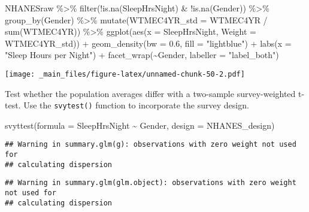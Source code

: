\documentclass[
]{book}
\newenvironment{Shaded}{\begin{snugshade}}{\end{snugshade}}
\newcommand{\AttributeTok}[1]{\textcolor[rgb]{0.77,0.63,0.00}{#1}}
\newcommand{\FloatTok}[1]{\textcolor[rgb]{0.00,0.00,0.81}{#1}}
\newcommand{\FunctionTok}[1]{\textcolor[rgb]{0.00,0.00,0.00}{#1}}
\newcommand{\NormalTok}[1]{#1}
\newcommand{\SpecialCharTok}[1]{\textcolor[rgb]{0.00,0.00,0.00}{#1}}
\newcommand{\StringTok}[1]{\textcolor[rgb]{0.31,0.60,0.02}{#1}}
\theoremstyle{definition}
\theoremstyle{definition}
\theoremstyle{definition}
\theoremstyle{definition}
\theoremstyle{remark}
\begin{document}
\begin{Shaded}
\begin{Highlighting}[]
\NormalTok{NHANESraw }\SpecialCharTok{\%\textgreater{}\%} 
  \FunctionTok{filter}\NormalTok{(}\SpecialCharTok{!}\FunctionTok{is.na}\NormalTok{(SleepHrsNight) }\SpecialCharTok{\&} \SpecialCharTok{!}\FunctionTok{is.na}\NormalTok{(Gender)) }\SpecialCharTok{\%\textgreater{}\%}
  \FunctionTok{group\_by}\NormalTok{(Gender) }\SpecialCharTok{\%\textgreater{}\%}
  \FunctionTok{mutate}\NormalTok{(}\AttributeTok{WTMEC4YR\_std =}\NormalTok{ WTMEC4YR }\SpecialCharTok{/} \FunctionTok{sum}\NormalTok{(WTMEC4YR)) }\SpecialCharTok{\%\textgreater{}\%}
  \FunctionTok{ggplot}\NormalTok{(}\FunctionTok{aes}\NormalTok{(}\AttributeTok{x =}\NormalTok{ SleepHrsNight, }\AttributeTok{Weight =}\NormalTok{ WTMEC4YR\_std)) }\SpecialCharTok{+}
  \FunctionTok{geom\_density}\NormalTok{(}\AttributeTok{bw =} \FloatTok{0.6}\NormalTok{, }\AttributeTok{fill =} \StringTok{"lightblue"}\NormalTok{) }\SpecialCharTok{+}
  \FunctionTok{labs}\NormalTok{(}\AttributeTok{x =} \StringTok{"Sleep Hours per Night"}\NormalTok{) }\SpecialCharTok{+}
  \FunctionTok{facet\_wrap}\NormalTok{(}\SpecialCharTok{\textasciitilde{}}\NormalTok{Gender, }\AttributeTok{labeller =} \StringTok{"label\_both"}\NormalTok{)}
\end{Highlighting}
\end{Shaded}

\texttt{[image: \_main\_files/figure-latex/unnamed-chunk-50-2.pdf]}

Test whether the population averages differ with a two-sample survey-weighted t-test. Use the \texttt{svytest()} function to incorporate the survey design.

\begin{Shaded}
\begin{Highlighting}[]
\FunctionTok{svyttest}\NormalTok{(}\AttributeTok{formula =}\NormalTok{ SleepHrsNight }\SpecialCharTok{\textasciitilde{}}\NormalTok{ Gender, }\AttributeTok{design =}\NormalTok{ NHANES\_design)}
\end{Highlighting}
\end{Shaded}

\begin{verbatim}
## Warning in summary.glm(g): observations with zero weight not used for
## calculating dispersion
\end{verbatim}

\begin{verbatim}
## Warning in summary.glm(glm.object): observations with zero weight not used for
## calculating dispersion
\end{verbatim}
\end{document}
